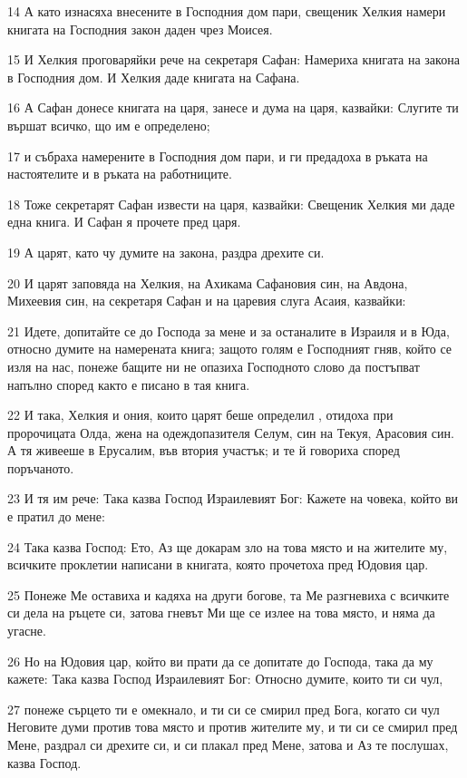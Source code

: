 \par 14 А като изнасяха внесените в Господния дом пари, свещеник Хелкия намери книгата на Господния закон даден чрез Моисея.
\par 15 И Хелкия проговаряйки рече на секретаря Сафан: Намериха книгата на закона в Господния дом. И Хелкия даде книгата на Сафана.
\par 16 А Сафан донесе книгата на царя, занесе и дума на царя, казвайки: Слугите ти вършат всичко, що им е определено;
\par 17 и събраха намерените в Господния дом пари, и ги предадоха в ръката на настоятелите и в ръката на работниците.
\par 18 Тоже секретарят Сафан извести на царя, казвайки: Свещеник Хелкия ми даде една книга. И Сафан я прочете пред царя.
\par 19 А царят, като чу думите на закона, раздра дрехите си.
\par 20 И царят заповяда на Хелкия, на Ахикама Сафановия син, на Авдона, Михеевия син, на секретаря Сафан и на царевия слуга Асаия, казвайки:
\par 21 Идете, допитайте се до Господа за мене и за останалите в Израиля и в Юда, относно думите на намерената книга; защото голям е Господният гняв, който се изля на нас, понеже бащите ни не опазиха Господното слово да постъпват напълно според както е писано в тая книга.
\par 22 И така, Хелкия и ония, които царят беше определил , отидоха при пророчицата Олда, жена на одеждопазителя Селум, син на Текуя, Арасовия син. А тя живееше в Ерусалим, във втория участък; и те й говориха според поръчаното.
\par 23 И тя им рече: Така казва Господ Израилевият Бог: Кажете на човека, който ви е пратил до мене:
\par 24 Така казва Господ: Ето, Аз ще докарам зло на това място и на жителите му, всичките проклетии написани в книгата, която прочетоха пред Юдовия цар.
\par 25 Понеже Ме оставиха и кадяха на други богове, та Ме разгневиха с всичките си дела на ръцете си, затова гневът Ми ще се излее на това място, и няма да угасне.
\par 26 Но на Юдовия цар, който ви прати да се допитате до Господа, така да му кажете: Така казва Господ Израилевият Бог: Относно думите, които ти си чул,
\par 27 понеже сърцето ти е омекнало, и ти си се смирил пред Бога, когато си чул Неговите думи против това място и против жителите му, и ти си се смирил пред Мене, раздрал си дрехите си, и си плакал пред Мене, затова и Аз те послушах, казва Господ.
